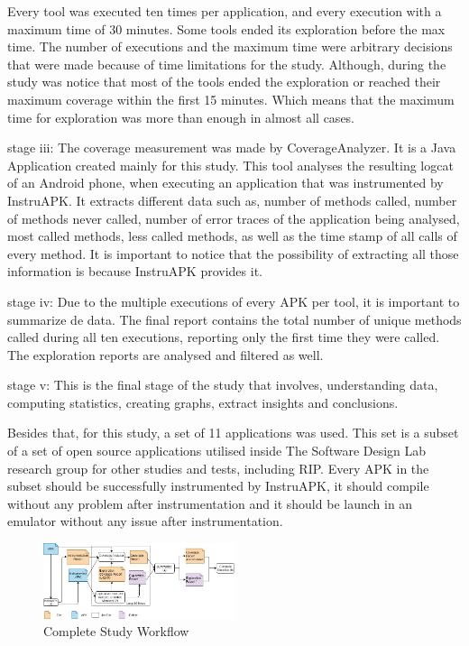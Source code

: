 Every tool was executed ten times per application, and every execution with a maximum time of 30 minutes. Some tools ended its exploration before the max time. 
The number of executions and the maximum time were arbitrary decisions that were made because of time limitations for the study. Although, during the study was notice that most of the tools ended the exploration or reached their maximum coverage within the first 15 minutes. Which means that the maximum time for exploration was more than enough in almost all cases. 
 
stage iii: The coverage measurement was made by CoverageAnalyzer. It is a Java Application created mainly for this study. This tool analyses the resulting logcat of an Android phone, when executing an application that was instrumented by InstruAPK. It extracts different data such as, number of methods called, number of  methods never called, number of error traces of the application being analysed, most called methods, less called methods, as well as the time stamp of all calls of every method. It is important to notice that the possibility of extracting all those information is because InstruAPK provides it.

stage iv: Due to the multiple executions of every APK per tool, it is important to summarize de data. The final report contains the total number of unique methods called during all ten executions, reporting only the first time they were called.
The exploration reports are analysed and filtered as well.

stage v: This is the final stage of the study that involves, understanding data, computing statistics, creating graphs, extract insights and conclusions. 

Besides that, for this study, a set of 11 applications was used. This set is a subset of a set of open source applications utilised inside The Software Design Lab research group for other studies and tests, including RIP. Every APK in the subset should be successfully instrumented by InstruAPK, it should compile without any problem after instrumentation and it should be launch in an emulator without any issue after instrumentation.

\begin{figure}[h]
	\centering
	\includegraphics[width=0.5\textwidth]{img/workflow.jpg}
	\vspace{-0.5cm}
	\caption{Complete Study Workflow}
	\label{procesoTests}
\end{figure} 
